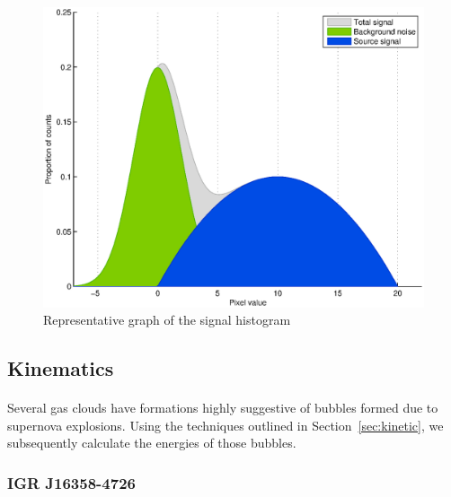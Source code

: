 \documentclass[a4paper, titlepage, oneside]{article}
\begin{document}
\begin{multicols}{2}
\begin{figure}[H]
  \centering
  \includegraphics[width = \columnwidth]{figures/noise-analysis}
  \caption{Representative graph of the signal histogram}
  \label{fig:noise}
\end{figure}

\subsection{Kinematics}
\paragraph{}
Several gas clouds have formations highly suggestive of bubbles formed due to supernova explosions. Using the techniques outlined in Section~\ref{sec:kinetic}, we subsequently calculate the energies of those bubbles.

\subsubsection{IGR J16358-4726}


\end{multicols}
\end{document}
